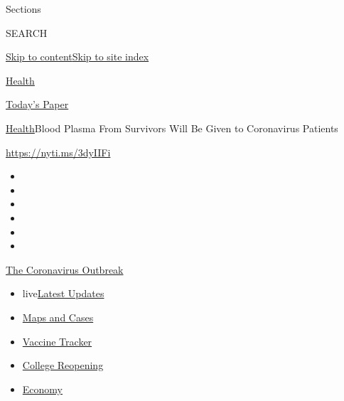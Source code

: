 Sections

SEARCH

\protect\hyperlink{site-content}{Skip to
content}\protect\hyperlink{site-index}{Skip to site index}

\href{https://www.nytimes.com/section/health}{Health}

\href{https://myaccount.nytimes.com/auth/login?response_type=cookie\&client_id=vi}{}

\href{https://www.nytimes.com/section/todayspaper}{Today's Paper}

\href{/section/health}{Health}\textbar{}Blood Plasma From Survivors Will
Be Given to Coronavirus Patients

\url{https://nyti.ms/3dyIIFi}

\begin{itemize}
\item
\item
\item
\item
\item
\item
\end{itemize}

\href{https://www.nytimes.com/news-event/coronavirus?action=click\&pgtype=Article\&state=default\&region=TOP_BANNER\&context=storylines_menu}{The
Coronavirus Outbreak}

\begin{itemize}
\tightlist
\item
  live\href{https://www.nytimes.com/2020/08/04/world/coronavirus-cases.html?action=click\&pgtype=Article\&state=default\&region=TOP_BANNER\&context=storylines_menu}{Latest
  Updates}
\item
  \href{https://www.nytimes.com/interactive/2020/us/coronavirus-us-cases.html?action=click\&pgtype=Article\&state=default\&region=TOP_BANNER\&context=storylines_menu}{Maps
  and Cases}
\item
  \href{https://www.nytimes.com/interactive/2020/science/coronavirus-vaccine-tracker.html?action=click\&pgtype=Article\&state=default\&region=TOP_BANNER\&context=storylines_menu}{Vaccine
  Tracker}
\item
  \href{https://www.nytimes.com/2020/08/02/us/covid-college-reopening.html?action=click\&pgtype=Article\&state=default\&region=TOP_BANNER\&context=storylines_menu}{College
  Reopening}
\item
  \href{https://www.nytimes.com/live/2020/08/04/business/stock-market-today-coronavirus?action=click\&pgtype=Article\&state=default\&region=TOP_BANNER\&context=storylines_menu}{Economy}
\end{itemize}


